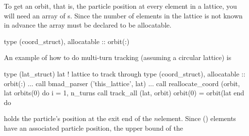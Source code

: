 To get an orbit, that is, the particle position at every element in a
lattice, you will need an array of s. Since the
number of elements in the lattice is not known in advance the array
must be declared to be allocatable.
\begin{example}
  type (coord_struct), allocatable :: orbit(:)
\end{example}
An example of how to do multi-turn tracking (assuming a circular lattice) is
\begin{example}
  type (lat_struct) lat             ! lattice to track through
  type (coord_struct), allocatable :: orbit(:)
  ...
  call bmad_parser ('this_lattice', lat)
  ...
  call reallocate_coord (orbit, lat%
  orbits(0)%
  do i = 1, n_turns
    call track_all (lat, orbit)
    orbit(0) = orbit(lat%
  end do
\end{example}
 holds the particle's position at the exit end of the
$n$\Th element. Since  () elements
have an associated particle position, the upper bound of the
